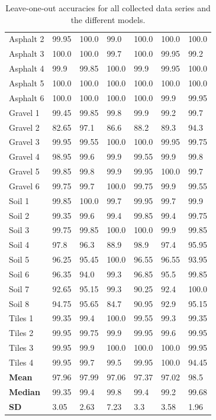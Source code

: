 \begin{table}
\begin{center}
\begin{adjustbox}{totalheight=\baselineskip}
\begin{tabular}{|l|l|l|l|l|l|l|}
		Asphalt 2 & 99.95 & 100.0 & 99.0 & 100.0 & 100.0 & 100.0\\
		Asphalt 3 & 100.0 & 100.0 & 99.7 & 100.0 & 99.95 & 99.2\\
		Asphalt 4 & 99.9 & 99.85 & 100.0 & 99.9 & 99.95 & 100.0\\
		Asphalt 5 & 100.0 & 100.0 & 100.0 & 100.0 & 100.0 & 100.0\\
		Asphalt 6 & 100.0 & 100.0 & 100.0 & 100.0 & 99.9 & 99.95\\
		\hline
		Gravel 1 & 99.45 & 99.85 & 99.8 & 99.9 & 99.2 & 99.7\\
		Gravel 2 & \cellcolor{red!20}82.65 & 97.1 & \cellcolor{red!20}86.6 & \cellcolor{red!20}88.2 & \cellcolor{red!20}89.3 & 94.3\\
		Gravel 3 & 99.95 & 99.55 & 100.0 & 100.0 & 99.95 & 99.75\\
		Gravel 4 & 98.95 & 99.6 & 99.9 & 99.55 & 99.9 & 99.8\\
		Gravel 5 & 99.85 & 99.8 & 99.9 & 99.95 & 100.0 & 99.7\\
		Gravel 6 & 99.75 & 99.7 & 100.0 & 99.75 & 99.9 & 99.55\\
		\hline
		Soil 1 & 99.85 & 100.0 & 99.7 & 99.95 & 99.7 & 99.9\\
		Soil 2& 99.35 & 99.6 & 99.4 & 99.85 & 99.4 & 99.75\\
		Soil 3 & 99.75 & 99.85 & 100.0 & 100.0 & 99.9 & 99.85\\
		Soil 4 & 97.8 & 96.3 & \cellcolor{red!20}88.9 & 98.9 & 97.4 & 95.95\\
		Soil 5 & 96.25 & 95.45 & 100.0 & 96.55 & 96.55 & 93.95\\
		Soil 6 & 96.35 & 94.0 & 99.3 & 96.85 & 95.5 & 99.85\\
		Soil 7 & 92.65 & 95.15 & 99.3 & 90.25 & 92.4 & 100.0\\
		Soil 8 & 94.75 & 95.65 & \cellcolor{red!20}84.7 & 90.95 & 92.9 & 95.15\\
		\hline
		Tiles 1 & 99.35 & 99.4 & 100.0 & 99.55 & 99.3 & 99.35\\
		Tiles 2 & 99.95 & 99.75 & 99.9 & 99.95 & 99.6 & 99.95\\
		Tiles 3 & 99.95 & 99.9 & 100.0 & 100.0 & 100.0 & 99.95\\
		Tiles 4 & 99.95 & 99.7 & 99.5 & 99.95 & 100.0 & 94.45\\
		\hline
		\textbf{Mean} & 97.96 & 97.99 & 97.06 & 97.37 & 97.02 & \cellcolor{green!20}98.5\\
		\textbf{Median} & 99.35 & 99.4 & \cellcolor{green!20}99.8 & 99.4 & 99.2 & 99.68\\
		\textbf{SD} & 3.05 & 2.63 & 7.23 & 3.3 & 3.58 & \cellcolor{green!20}1.96\\
		\hline
		\end{tabular}
	\end{adjustbox}
	\end{center}
	\caption{Leave-one-out accuracies for all collected data series and the different models.}
	\label{tab:loo}
\end{table}

